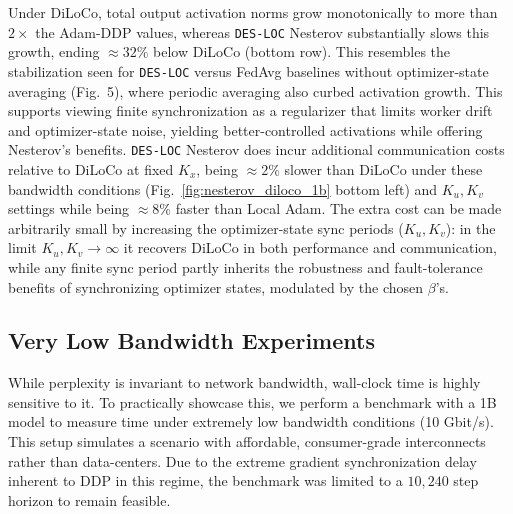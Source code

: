 Under DiLoCo, total output activation norms grow monotonically to more than $2\times$ the Adam-DDP values, whereas \texttt{DES-LOC} Nesterov substantially slows this growth, ending $\approx 32\%$ below DiLoCo (bottom row). This resembles the stabilization seen for \texttt{DES-LOC} versus FedAvg baselines without optimizer-state averaging (Fig.~5), where periodic averaging also curbed activation growth. This supports viewing finite synchronization as a regularizer that limits worker drift and optimizer-state noise, yielding better-controlled activations while offering Nesterov's benefits. \texttt{DES-LOC} Nesterov does incur additional communication costs relative to DiLoCo at fixed $K_x$, being $\approx 2\%$ slower than DiLoCo under these bandwidth conditions (Fig.~\ref{fig:nesterov_diloco_1b} bottom left) and $K_u, K_v$ settings while being $\approx 8\%$ faster than Local Adam. The extra cost can be made arbitrarily small by increasing the optimizer-state sync periods ($K_u, K_v$): in the limit $K_u, K_v \rightarrow \infty$ it recovers DiLoCo in both performance and communication, while any finite sync period partly inherits the robustness and fault-tolerance benefits of synchronizing optimizer states, modulated by the chosen $\beta$'s.

\begin{center}\end{center}

\subsection{Very Low Bandwidth Experiments}
\label{sec:b6_low_bandwidth}

While perplexity is invariant to network bandwidth, wall-clock time is highly sensitive to it. To practically showcase this, we perform a benchmark with a 1B model to measure time under extremely low bandwidth conditions (10 Gbit/s). This setup simulates a scenario with affordable, consumer-grade interconnects rather than data-centers. Due to the extreme gradient synchronization delay inherent to DDP in this regime, the benchmark was limited to a $10{,}240$ step horizon to remain feasible.

